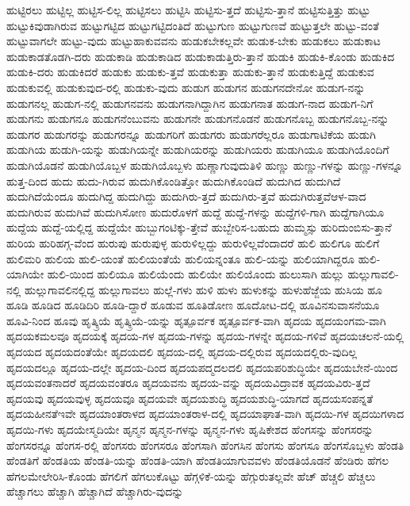 {ಹುಟ್ಟಿರಲು
ಹುಟ್ಟಿಲ್ಲ
ಹುಟ್ಟಿಸ-ಲಿಲ್ಲ
ಹುಟ್ಟಿಸಲು
ಹುಟ್ಟಿಸಿ
ಹುಟ್ಟಿಸು-ತ್ತದೆ
ಹುಟ್ಟಿಸು-ತ್ತಾನೆ
ಹುಟ್ಟಿಸುತ್ತಿತ್ತು
ಹುಟ್ಟು
ಹುಟ್ಟುಕಿವುಡಾಗಿರುವ
ಹುಟ್ಟುಗಟ್ಟಿದ
ಹುಟ್ಟುಗಟ್ಟಿದಂತಿದೆ
ಹುಟ್ಟುಗುಣ
ಹುಟ್ಟುಗುಣವೆ
ಹುಟ್ಟುತ್ತಲೇ
ಹುಟ್ಟು-ವಂತೆ
ಹುಟ್ಟುವಾಗಲೇ
ಹುಟ್ಟು-ವುದು
ಹುಟ್ಟುಹಾಕುವವನು
ಹುಡುಕಬೇಕಲ್ಲವೇ
ಹುಡುಕ-ಬೇಕು
ಹುಡುಕಲು
ಹುಡುಕಾಟ
ಹುಡುಕಾಡತೊಡಗಿ-ದರು
ಹುಡುಕಾಡಿ
ಹುಡುಕಾಡಿದ
ಹುಡುಕಾಡುತ್ತಿರು-ತ್ತಾನೆ
ಹುಡುಕಿ
ಹುಡುಕಿ-ಕೊಂಡು
ಹುಡುಕಿದ
ಹುಡುಕಿ-ದರು
ಹುಡುಕಿದರೆ
ಹುಡುಕು
ಹುಡುಕು-ತ್ತವೆ
ಹುಡುಕುತ್ತಾ
ಹುಡುಕು-ತ್ತಾನೆ
ಹುಡುಕುತ್ತಿದ್ದೆ
ಹುಡುಕುವ
ಹುಡುಕುವಲ್ಲಿ
ಹುಡುಕುವುದ-ರಲ್ಲಿ
ಹುಡುಕು-ವುದು
ಹುಡುಗ
ಹುಡುಗನ
ಹುಡುಗನದೇನೋ
ಹುಡುಗ-ನನ್ನು
ಹುಡುಗನಲ್ಲ
ಹುಡುಗ-ನಲ್ಲಿ
ಹುಡುಗನವನು
ಹುಡುಗನಾಗಿದ್ದಾಗಿನ
ಹುಡುಗನಾತ
ಹುಡುಗ-ನಾದ
ಹುಡುಗ-ನಿಗೆ
ಹುಡುಗನು
ಹುಡುಗನೂ
ಹುಡುಗನೆಂಬುವನು
ಹುಡುಗನೇ
ಹುಡುಗನೊಡನೆ
ಹುಡುಗನೊಬ್ಬ
ಹುಡುಗನೊಬ್ಬ-ನನ್ನು
ಹುಡುಗರ
ಹುಡುಗರನ್ನು
ಹುಡುಗರನ್ನೂ
ಹುಡುಗರಿಗೆ
ಹುಡುಗರು
ಹುಡುಗರೆಲ್ಲರೂ
ಹುಡುಗಾಟಿಕೆಯ
ಹುಡುಗಿ
ಹುಡುಗಿಯ
ಹುಡುಗಿ-ಯನ್ನು
ಹುಡುಗಿಯನ್ನೇ
ಹುಡುಗಿಯರನ್ನು
ಹುಡುಗಿಯರು
ಹುಡುಗಿಯೂ
ಹುಡುಗಿಯೊಂದಿಗೆ
ಹುಡುಗಿಯೊಡನೆ
ಹುಡುಗಿಯೊಬ್ಬಳ
ಹುಡುಗಿಯೊಬ್ಬಳು
ಹುಣ್ಣಾಗುವುದುತಿಳಿ
ಹುಣ್ಣು
ಹುಣ್ಣು-ಗಳನ್ನು
ಹುಣ್ಣು-ಗಳನ್ನೂ
ಹುತ್ತ-ದಿಂದ
ಹುದು
ಹುದು-ಗಿರುವ
ಹುದುಗಿಕೊಂಡಿತ್ತೋ
ಹುದುಗಿಕೊಂಡಿದೆ
ಹುದುಗಿದ
ಹುದುಗಿದೆ
ಹುದುಗಿದೆಯೆಂದೂ
ಹುದುಗಿದ್ದ
ಹುದುಗಿದ್ದು
ಹುದುಗಿರು-ತ್ತದೆ
ಹುದುಗಿರು-ತ್ತವೆ
ಹುದುಗಿರುತ್ತವೆಆಳ-ವಾದ
ಹುದುಗಿರುವ
ಹುದುಗಿವೆ
ಹುದುಗಿಸೋಣ
ಹುದುರೊಳಗೆ
ಹುದ್ದೆ
ಹುದ್ದೆ-ಗಳನ್ನು
ಹುದ್ದೆಗಳಿ-ಗಾಗಿ
ಹುದ್ದೆಗಾಗಿಯೂ
ಹುದ್ದೆಯ
ಹುದ್ದೆ-ಯಲ್ಲಿದ್ದ
ಹುದ್ದೆಯೇ
ಹುಬ್ಬುಗಂಟಿಕ್ಕು-ತ್ತೇವೆ
ಹುಬ್ಬೇರಿಸ-ಬಹುದು
ಹುಮ್ಮಸ್ಸು
ಹುರಿದುಂಬಿಸು-ತ್ತಾನೆ
ಹುರಿಯ
ಹುರಿಹಗ್ಗ-ವೆಂದ
ಹುರುಪು
ಹುರುಪುಳ್ಳ
ಹುರುಳಿಲ್ಲದ್ದು
ಹುರುಳಿಲ್ಲವೆಂದಾದರೆ
ಹುಲಿ
ಹುಲಿಗೂ
ಹುಲಿಗೆ
ಹುಲಿಮರಿ
ಹುಲಿಯ
ಹುಲಿ-ಯಂತೆ
ಹುಲಿಯಂತೆಯೆ
ಹುಲಿಯನ್ನಂತೂ
ಹುಲಿ-ಯನ್ನು
ಹುಲಿಯಾಗಿದ್ದರೂ
ಹುಲಿ-ಯಾಗಿಯೇ
ಹುಲಿ-ಯಿಂದ
ಹುಲಿಯೂ
ಹುಲಿಯೆಂದು
ಹುಲಿಯೇ
ಹುಲಿಯೊಂದು
ಹುಲುಸಾಗಿ
ಹುಲ್ಲು
ಹುಲ್ಲುಗಾವಲಿ-ನಲ್ಲಿ
ಹುಲ್ಲುಗಾವಲಿನಲ್ಲಿದ್ದ
ಹುಲ್ಲುಗಾವಲು
ಹುಲ್ಲೆ-ಗಳು
ಹುಳಿ
ಹುಳು
ಹುಳುಕನ್ನು
ಹುಳುಹೆಜ್ಜೆಯ
ಹುಸಿಯ
ಹೂ
ಹೂಡಿ
ಹೂಡಿದ
ಹೂಡಿದಿರಿ
ಹೂಡಿ-ದ್ದಾರೆ
ಹೂಡುವ
ಹೂತಿಡೋಣ
ಹೂದೋಟ-ದಲ್ಲಿ
ಹೂವಿನಸುವಾಸನೆಯೂ
ಹೂವಿ-ನಿಂದ
ಹೂವು
ಹೃತ್ಕ್ರಿಯೆ
ಹೃತ್ಕ್ರಿಯೆ-ಯನ್ನು
ಹೃತ್ಪೂರ್ವಕ
ಹೃತ್ಪೂರ್ವಕ-ವಾಗಿ
ಹೃದಯ
ಹೃದಯಂಗಮ-ವಾಗಿ
ಹೃದಯಕಮಲವೂ
ಹೃದಯಕ್ಕೆ
ಹೃದಯ-ಗಳ
ಹೃದಯ-ಗಳನ್ನು
ಹೃದಯ-ಗಳನ್ನೇ
ಹೃದಯ-ಗಳಿವೆ
ಹೃದಯಚಲನೆ-ಯಲ್ಲಿ
ಹೃದಯದ
ಹೃದಯದಂತೆಯೇ
ಹೃದಯದಲಿ
ಹೃದಯ-ದಲ್ಲಿ
ಹೃದಯ-ದಲ್ಲಿರುವ
ಹೃದಯದಲ್ಲಿರು-ವುದಿಲ್ಲ
ಹೃದಯದಲ್ಲೂ
ಹೃದಯ-ದಲ್ಲೇ
ಹೃದಯ-ದಿಂದ
ಹೃದಯಪದ್ಮದಲದಲಿ
ಹೃದಯಪರಿಶುದ್ಧಿಯೇ
ಹೃದಯಬೇನೆ-ಯಿಂದ
ಹೃದಯವಂತನಾದರೆ
ಹೃದಯವಂತರೂ
ಹೃದಯವನು
ಹೃದಯ-ವನ್ನು
ಹೃದಯವಿದ್ರಾವಕ
ಹೃದಯವಿರು-ತ್ತದೆ
ಹೃದಯವು
ಹೃದಯವುಳ್ಳ
ಹೃದಯವೂ
ಹೃದಯವೇ
ಹೃದಯಶುದ್ಧಿ
ಹೃದಯಶುದ್ಧಿ-ಯಾಗದೆ
ಹೃದಯಸಂಪನ್ನತೆ
ಹೃದಯಹೀನತೆಇವೇ
ಹೃದಯಾಂತರಾಳದ
ಹೃದಯಾಂತರಾಳ-ದಲ್ಲಿ
ಹೃದಯಾಘಾತ-ವಾಗಿ
ಹೃದಯಿ-ಗಳ
ಹೃದಯಿಗಳಾದ
ಹೃದಯಿ-ಗಳು
ಹೃದಯೇಸ್ಮದಿಯೇ
ಹೃನ್ಮನ
ಹೃನ್ಮನ-ಗಳನ್ನು
ಹೃನ್ಮನ-ಗಳು
ಹೃಷಿಕೇಶದ
ಹೆಂಗಸನ್ನು
ಹೆಂಗಸರನ್ನು
ಹೆಂಗಸರನ್ನೂ
ಹೆಂಗಸ-ರಲ್ಲಿ
ಹೆಂಗಸರು
ಹೆಂಗಸರೂ
ಹೆಂಗಸಾಗಿ
ಹೆಂಗಸಿನ
ಹೆಂಗಸು
ಹೆಂಗಸೂ
ಹೆಂಗಸೊಬ್ಬಳು
ಹೆಂಡತಿ
ಹೆಂಡತಿಗೆ
ಹೆಂಡತಿಯ
ಹೆಂಡತಿ-ಯನ್ನು
ಹೆಂಡತಿ-ಯಾಗಿ
ಹೆಂಡತಿಯಾಗುವವಳು
ಹೆಂಡತಿಯೊಡನೆ
ಹೆಂಡಿರು
ಹೆಗಲ
ಹೆಗಲಮೇಲೇರಿಸಿ-ಕೊಂಡು
ಹೆಗಲಿಗೆ
ಹೆಗಲುಕೊಟ್ಟು
ಹೆಗ್ಗಳಿಕೆ-ಯನ್ನು
ಹೆಗ್ಗುರುತಲ್ಲವೇ
ಹೆಚ್
ಹೆಚ್ಚಲಿ
ಹೆಚ್ಚಲು
ಹೆಚ್ಚಾಗಲು
ಹೆಚ್ಚಾಗಿ
ಹೆಚ್ಚಾಗಿದೆ
ಹೆಚ್ಚಾಗಿರು-ವುದನ್ನು
}
